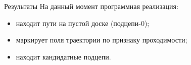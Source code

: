 \begin{frame}{Результаты}
На данный момент программная реализация: \\
\begin{itemize}
\item находит пути на пустой доске (подцепи-0); \\
\item маркирует поля траектории по признаку проходимости; \\
\item находит кандидатные подцепи. \\
\end{itemize}
\end{frame}
